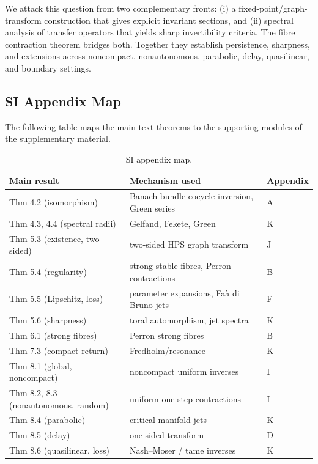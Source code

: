 \documentclass[11pt,a4paper]{article}
\theoremstyle{plain}
\theoremstyle{definition}
\theoremstyle{remark}
\numberwithin{equation}{section}
\numberwithin{figure}{section}
\begin{document}
We attack this question from two complementary fronts: (i) a fixed-point/graph-transform construction that gives explicit invariant sections, and (ii) spectral analysis of transfer operators that yields sharp invertibility criteria. The fibre contraction theorem bridges both. Together they establish persistence, sharpness, and extensions across noncompact, nonautonomous, parabolic, delay, quasilinear, and boundary settings.

\subsection*{SI Appendix Map}

The following table maps the main-text theorems to the supporting modules of the supplementary material.

\begin{table}[h]
\centering
\caption{SI appendix map.}
\label{tab:supp-map}
\begin{tabular}{lll}
\textbf{Main result} & \textbf{Mechanism used} & \textbf{Appendix} \\
\hline
Thm 4.2 (isomorphism) & Banach-bundle cocycle inversion, Green series & A \\
Thm 4.3, 4.4 (spectral radii) & Gelfand, Fekete, Green & K \\
Thm 5.3 (existence, two-sided) & two-sided HPS graph transform & J \\
Thm 5.4 (regularity) & strong stable fibres, Perron contractions & B \\
Thm 5.5 (Lipschitz, loss) & parameter expansions, Faà di Bruno jets & F \\
Thm 5.6 (sharpness) & toral automorphism, jet spectra & K \\
Thm 6.1 (strong fibres) & Perron strong fibres & B \\
Thm 7.3 (compact return) & Fredholm/resonance & K \\
Thm 8.1 (global, noncompact) & noncompact uniform inverses & I \\
Thm 8.2, 8.3 (nonautonomous, random) & uniform one-step contractions & I \\
Thm 8.4 (parabolic) & critical manifold jets & K \\
Thm 8.5 (delay) & one-sided transform & D \\
Thm 8.6 (quasilinear, loss) & Nash–Moser / tame inverses & K \\
\end{tabular}
\end{table}
\end{document}
